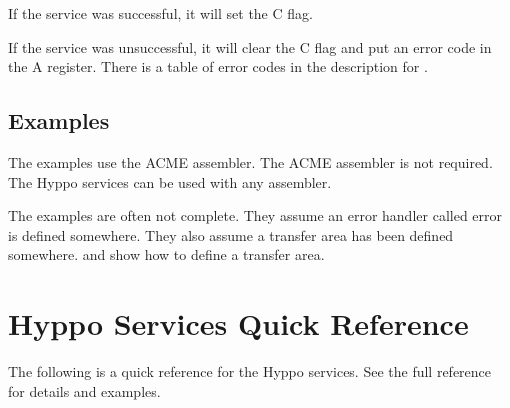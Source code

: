 If the service was successful, it will set the C flag.

If the service was unsuccessful, it will clear the C flag and put an error code
in the A register. There is a table of error codes in the description for
.

\subsection{Examples}
The examples use the ACME assembler. The ACME assembler is not required. The
Hyppo services can be used with any assembler.

The examples are often not complete. They assume an error handler called error
is defined somewhere. They also assume a transfer area has been defined
somewhere.  and 
show how to define a transfer area.


\newpage
\section{Hyppo Services Quick Reference}

The following is a quick reference for the Hyppo services. See the full reference for details and examples.

